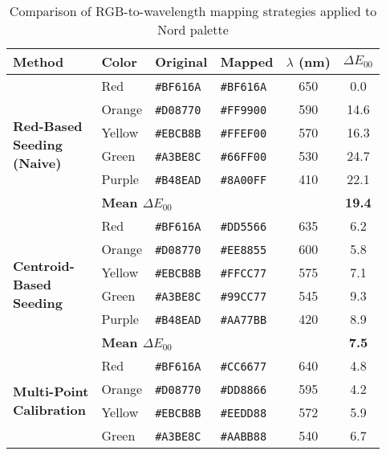 \documentclass[12pt,a4paper]{article}
\newcommand{\deltaE}{\Delta E_{00}}
\newcommand{\hexcolour}[1]{%
  \definecolor{tempcolour}{HTML}{#1}%
  \texttt{\##1}~\raisebox{0.2ex}{\fboxsep=0pt\fbox{\colorbox{tempcolour}{\phantom{XX}}}}%
}
\begin{document}
\begin{table}[H]
\centering
\caption{Comparison of RGB-to-wavelength mapping strategies applied to Nord palette}
\label{tab:nord-mapping-comparison}
\small
\begin{tabular}{llcccc}
\toprule
\textbf{Method} & \textbf{Color} & \textbf{Original} & \textbf{Mapped} & \textbf{$\lambda$ (nm)} & \textbf{$\deltaE$} \\
\midrule
\multirow{6}{*}{\parbox{2.2cm}{\textbf{Red-Based}\\\textbf{Seeding}\\\textbf{(Naive)}}} 
& Red & \hexcolour{BF616A} & \hexcolour{BF616A} & 650 & 0.0 \\
& Orange & \hexcolour{D08770} & \hexcolour{FF9900} & 590 & 14.6 \\
& Yellow & \hexcolour{EBCB8B} & \hexcolour{FFEF00} & 570 & 16.3 \\
& Green & \hexcolour{A3BE8C} & \hexcolour{66FF00} & 530 & 24.7 \\
& Purple & \hexcolour{B48EAD} & \hexcolour{8A00FF} & 410 & 22.1 \\
\cmidrule{2-6}
& \multicolumn{4}{l}{\textbf{Mean $\deltaE$}} & \textbf{19.4} \\
\midrule
\multirow{6}{*}{\parbox{2.2cm}{\textbf{Centroid-}\\\textbf{Based}\\\textbf{Seeding}}} 
& Red & \hexcolour{BF616A} & \hexcolour{DD5566} & 635 & 6.2 \\
& Orange & \hexcolour{D08770} & \hexcolour{EE8855} & 600 & 5.8 \\
& Yellow & \hexcolour{EBCB8B} & \hexcolour{FFCC77} & 575 & 7.1 \\
& Green & \hexcolour{A3BE8C} & \hexcolour{99CC77} & 545 & 9.3 \\
& Purple & \hexcolour{B48EAD} & \hexcolour{AA77BB} & 420 & 8.9 \\
\cmidrule{2-6}
& \multicolumn{4}{l}{\textbf{Mean $\deltaE$}} & \textbf{7.5} \\
\midrule
\multirow{6}{*}{\parbox{2.2cm}{\textbf{Multi-Point}\\\textbf{Calibration}}} 
& Red & \hexcolour{BF616A} & \hexcolour{CC6677} & 640 & 4.8 \\
& Orange & \hexcolour{D08770} & \hexcolour{DD8866} & 595 & 4.2 \\
& Yellow & \hexcolour{EBCB8B} & \hexcolour{EEDD88} & 572 & 5.9 \\
& Green & \hexcolour{A3BE8C} & \hexcolour{AABB88} & 540 & 6.7 \\

\end{tabular}
\end{table}
\end{document}
